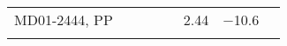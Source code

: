 \documentclass[tc, manuscript]{copernicus}
\begin{document}
\begin{table*}
{\begin{tabular}{lccccccl}
        MD01-2444, PP &&&&& 2.44 & $-$10.6 \\

        \bottomhline
      \end{tabular}}


    \end{table*}


\end{document}
